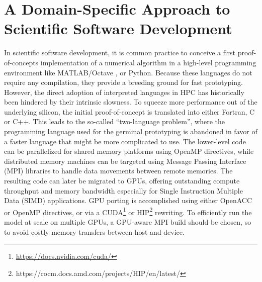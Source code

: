 \documentclass[../main.tex]{subfiles}
\begin{document}
    \justifying

    \section{A Domain-Specific Approach to Scientific Software Development}
    \label{section:domain-specific-approach-to-scientific-software-development}

        In scientific software development, it is common practice to conceive a first proof-of-concepts implementation of a numerical algorithm in a high-level programming environment like MATLAB/Octave \citep{lindfield18}, or Python. Because these languages do not require any compilation, they provide a breeding ground for fast prototyping. However, the direct adoption of interpreted languages in HPC has historically been hindered by their intrinsic slowness. To squeeze more performance out of the underlying silicon, the initial proof-of-concept is translated into either Fortran, C or C++. This leads to the so-called ``two-language problem'', where the programming language used for the germinal prototyping is abandoned in favor of a faster language that might be more complicated to use. The lower-level code can be parallelized for shared memory platforms using OpenMP directives, while distributed memory machines can be targeted using Message Passing Interface (MPI) libraries to handle data movements between remote memories. The resulting code can later be migrated to GPUs, offering outstanding compute throughput and memory bandwidth especially for Single Instruction Multiple Data (SIMD) applications. GPU porting is accomplished using either OpenACC or OpenMP directives, or via a CUDA\footnote{\url{https://docs.nvidia.com/cuda/}} or HIP\footnote{{https://rocm.docs.amd.com/projects/HIP/en/latest/}} rewriting. To efficiently run the model at scale on multiple GPUs, a GPU-aware MPI build should be chosen, so to avoid costly memory transfers between host and device.
\end{document}
